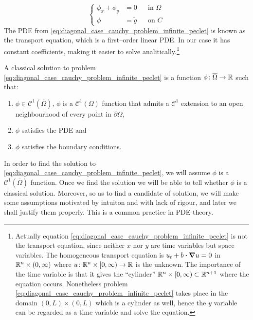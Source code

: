\begin{equation} \label{eq:diagonal_case_cauchy_problem_infinite_peclet}
	\left\{
	\begin{aligned}
		\phi_x + \phi_y &= 0 &
		&\text{in } \Omega \\
		\phi &= \tilde{g} &
		&\text{on } C
	\end{aligned}
	\right.
\end{equation}
The PDE from \eqref{eq:diagonal_case_cauchy_problem_infinite_peclet} is known as
the transport equation, which is a first--order linear PDE. In our case it has
constant coefficients, making it easier to solve analitically.\footnote{Actually
equation \eqref{eq:diagonal_case_cauchy_problem_infinite_peclet} is not the
transport equation, since neither $x$ nor $y$ are time variables but space
variables. The homogeneous transport equation is $u_t + b \vdot \grad{u} = 0$ in
$\mathbb{R}^n \times (0,\infty)$ where $u \colon \mathbb{R}^n \times [0,\infty) \to \mathbb{R}$
is the unknown. The importance of the time variable is that it gives the
``cylinder'' $\mathbb{R}^n \times [0,\infty) \subset \mathbb{R}^{n+1}$ where the equation
occurs. Nonetheless problem
\eqref{eq:diagonal_case_cauchy_problem_infinite_peclet} takes place in the
domain $(0, L) \times (0, L)$ which is a cylinder as well, hence the $y$
variable can be regarded as a time variable and solve the equation.}

\begin{definition}
	A classical solution to problem
	\eqref{eq:diagonal_case_cauchy_problem_infinite_peclet} is a function $\phi
	\colon \overline{\Omega} \rightarrow \mathbb{R}$ such that:
	\begin{enumerate}[label={(\roman*)}, topsep=0pt]
		\item $\phi \in \mathcal{C}^1(\overline{\Omega})$, \ie $\phi$ is a
		$\mathcal{C}^1(\Omega)$ function that admits a $\mathcal{C}^1$ extension
		to an open neighbourhood of every point in $\partial \Omega$,
		\item $\phi$ satisfies the PDE and
		\item $\phi$ satisfies the boundary conditions.
	\end{enumerate}
\end{definition}
\noindent
In order to find the solution to
\eqref{eq:diagonal_case_cauchy_problem_infinite_peclet}, we will assume $\phi$
is a $\mathcal{C}^1(\overline{\Omega})$ function. Once we find the solution we
will be able to tell whether $\phi$ is a classical solution. Moreover, so as to
find a candidate of solution, we will make some assumptions motivated by
intuiton and with lack of rigour, and later we shall justify them properly. This
is a common practice in PDE theory.

